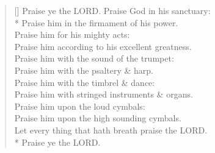 \documentclass[MAIN]{subfiles}
\begin{document}
\begin{verse}[\versewidth]
Praise ye the {\hge LORD}. Praise God in his sanctuary:\\*
\vin Praise him in the firmament of his power.\\
Praise him for his mighty acts:\\
\vin Praise him according to his excellent greatness.\\
Praise him with the sound of the trumpet:\\
\vin Praise him with the psaltery \& harp.\\
Praise him with the timbrel \& dance:\\
\vin Praise him with stringed instruments \& organs.\\
Praise him upon the loud cymbals:\\
\vin Praise him upon the high sounding cymbals.\\
Let every thing that hath breath praise the {\hge LORD}.\\*
\vin Praise ye the {\hge LORD}.
\end{verse}
\end{document}
